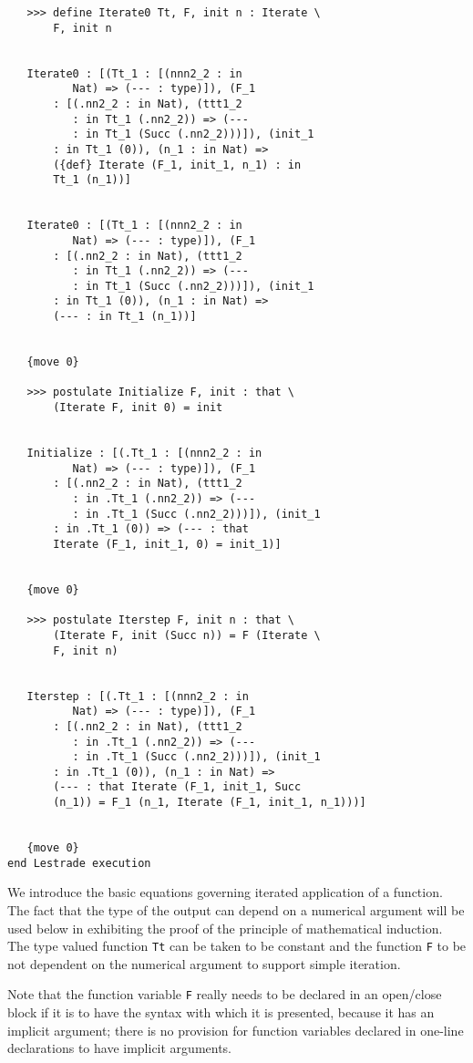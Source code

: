 \documentclass[12pt]{article}
\begin{document}
\begin{verbatim}
   >>> define Iterate0 Tt, F, init n : Iterate \
       F, init n


   Iterate0 : [(Tt_1 : [(nnn2_2 : in 
          Nat) => (--- : type)]), (F_1 
       : [(.nn2_2 : in Nat), (ttt1_2 
          : in Tt_1 (.nn2_2)) => (--- 
          : in Tt_1 (Succ (.nn2_2)))]), (init_1 
       : in Tt_1 (0)), (n_1 : in Nat) => 
       ({def} Iterate (F_1, init_1, n_1) : in 
       Tt_1 (n_1))]


   Iterate0 : [(Tt_1 : [(nnn2_2 : in 
          Nat) => (--- : type)]), (F_1 
       : [(.nn2_2 : in Nat), (ttt1_2 
          : in Tt_1 (.nn2_2)) => (--- 
          : in Tt_1 (Succ (.nn2_2)))]), (init_1 
       : in Tt_1 (0)), (n_1 : in Nat) => 
       (--- : in Tt_1 (n_1))]


   {move 0}

   >>> postulate Initialize F, init : that \
       (Iterate F, init 0) = init


   Initialize : [(.Tt_1 : [(nnn2_2 : in 
          Nat) => (--- : type)]), (F_1 
       : [(.nn2_2 : in Nat), (ttt1_2 
          : in .Tt_1 (.nn2_2)) => (--- 
          : in .Tt_1 (Succ (.nn2_2)))]), (init_1 
       : in .Tt_1 (0)) => (--- : that 
       Iterate (F_1, init_1, 0) = init_1)]


   {move 0}

   >>> postulate Iterstep F, init n : that \
       (Iterate F, init (Succ n)) = F (Iterate \
       F, init n)


   Iterstep : [(.Tt_1 : [(nnn2_2 : in 
          Nat) => (--- : type)]), (F_1 
       : [(.nn2_2 : in Nat), (ttt1_2 
          : in .Tt_1 (.nn2_2)) => (--- 
          : in .Tt_1 (Succ (.nn2_2)))]), (init_1 
       : in .Tt_1 (0)), (n_1 : in Nat) => 
       (--- : that Iterate (F_1, init_1, Succ 
       (n_1)) = F_1 (n_1, Iterate (F_1, init_1, n_1)))]


   {move 0}
end Lestrade execution
\end{verbatim}

We introduce the basic equations governing iterated application of a function.  The fact that the type of the output can depend on a numerical argument
will be used below in exhibiting the proof of the principle of mathematical induction.  The type valued function {\tt Tt} can be taken to be constant and
the function {\tt F} to be not dependent on the numerical argument to support simple iteration.

Note that the function variable {\tt F} really needs to be declared in an open/close block if it is to have the syntax with which it is presented, because it has an implicit argument; there is no provision for function variables
declared in one-line declarations to have implicit arguments.
\end{document}
